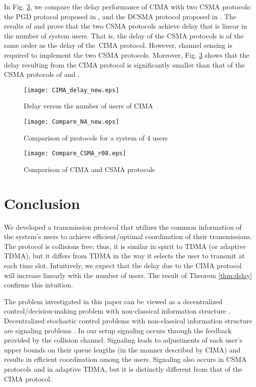 \documentclass[onecolumn,draftcls]{IEEEtran}
\newcommand{\g}{\text{CIMA}}
\begin{document}
In Fig. \ref{fig:Compare_CSMA}, we compare the delay performance of $\g$ with two CSMA protocols: 
the PGD protocol proposed in \cite{jiang2012fast}, and the DCSMA protocol proposed in \cite{lee2014provable}.
The results of \cite{jiang2012fast} and \cite{lee2014provable} prove that the two CSMA protocols achieve delay that is linear in the number of system users.
That is, the delay of the CSMA protocols is of the same order as the delay of the\ $\g$ protocol.
However, channel sensing is required to implement the two CSMA protocols.
Moreover, Fig. \ref{fig:Compare_CSMA} shows that the delay resulting from the $\g$ protocol is significantly smaller than that of the CSMA protocols of \cite{jiang2012fast} and \cite{lee2014provable}.



\begin{figure}
\texttt{[image: CIMA\_delay\_new.eps]}
\caption{Delay versus the number of users of $\g$}
\label{fig:CIMA}
\end{figure}
\begin{figure}
\texttt{[image: Compare\_N4\_new.eps]}
\caption{Comparison of protocols for a system of $4$ users}
\label{fig:Compare}
\end{figure}

\begin{figure}
\texttt{[image: Compare\_CSMA\_r08.eps]}
\caption{Comparison of $\g$ and CSMA protocols}
\label{fig:Compare_CSMA}
\end{figure}


\section{Conclusion}
\label{sec:conclusion}
We developed a transmission protocol that utilizes the common information of the system's users to achieve efficient/optimal coordination of their transmissions.
The protocol is collisions free; thus, it is similar in spirit to TDMA (or adaptive TDMA), but it differs from TDMA in the way it selects the user to transmit at each time slot.
Intuitively, we expect that the delay due to the $\g$ protocol will increase linearly with the number of users. The result of Theorem \ref{thm:delay} confirms this intuition.

The problem investigated in this paper can be viewed as a decentralized control/decision-making problem with non-classical information structure \cite{witsenhausen1971separation}. Decentralized stochastic control problems with non-classical information structure are signaling problems \cite{ho1980team}. In our setup signaling occurs through the feedback provided by the collision channel. Signaling leads to adjustments of each user's upper bounds on their queue lengths (in the manner described by $\g$) and results in efficient coordination among the users.
Signaling also occurs in CSMA protocols and in adaptive TDMA, but it is distinctly different from that of the $\g$ protocol.
\end{document}
